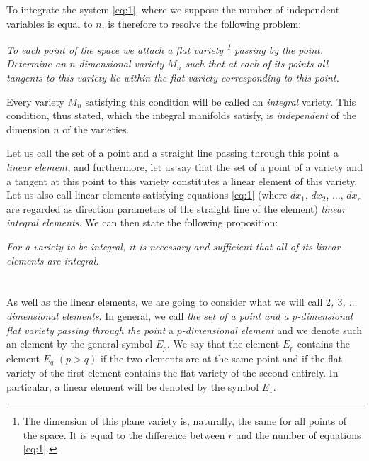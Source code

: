 \documentclass[leqno,11pt]{book}
\theoremstyle{shape1}
\theoremstyle{shapesmall}
\newcommand{\somespace}{\vspace{9pt}}
\begin{document}
To integrate the system \eqref{eq:1}, where we suppose the number of independent variables is equal to $n$, is therefore to resolve the following problem:

\somespace

\emph{To each point of the space we attach a flat variety \footnote{The dimension of this plane variety is, naturally, the same for all points of the space. It is equal to the difference between $r$ and the number of equations \eqref{eq:1}.} passing by the point. Determine an $n$-dimensional variety $M_{n}$ such that at each of its points all tangents to this variety lie within the flat variety corresponding to this point.}

\somespace

Every variety $M_{n}$ satisfying this condition will be called an \emph{integral} variety. This condition, thus stated, which the integral manifolds satisfy, is \emph{independent} of the dimension $n$ of the varieties.

Let us call the set of a point and a straight line passing through this point a \emph{linear element}, and furthermore, let us say that the set of a point of a variety and a tangent at this point to this variety constitutes a linear element of this variety. Let us also call linear elements satisfying equations \eqref{eq:1} (where $dx_{1}$, $dx_{2}$, $\dots$, $dx_{r}$ are regarded as direction parameters of the straight line of the element) \emph{linear integral elements}. We can then state the following proposition:

\somespace

\emph{For a variety to be integral, it is necessary and sufficient that all of its linear elements are integral.}

\section{}
\label{sec:2}

As well as the linear elements, we are going to consider what we will call \emph{$2$, $3$, $\dots$ dimensional elements}. In general, we call \emph{the set of a point and a $p$-dimensional flat variety passing through the point} a \emph{$p$-dimensional element} and we denote such an element by the general symbol $E_{p}$. We say that the element $E_{p}$ contains the element $E_{q}$ $(p>q)$ if the two elements are at the same point and if the flat variety of the first element contains the flat variety of the second entirely. In particular, a linear element will be denoted by the symbol $E_{1}$.
\end{document}
